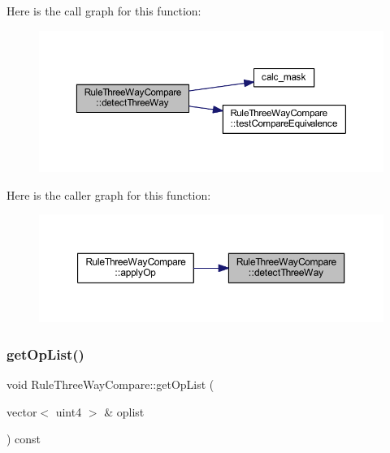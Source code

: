 Here is the call graph for this function\+:
\nopagebreak
\begin{figure}[H]
\begin{center}
\leavevmode
\includegraphics[width=350pt]{class_rule_three_way_compare_a7f9059f988deedd2d2b13697e4dac1c3_cgraph}
\end{center}
\end{figure}
Here is the caller graph for this function\+:
\nopagebreak
\begin{figure}[H]
\begin{center}
\leavevmode
\includegraphics[width=350pt]{class_rule_three_way_compare_a7f9059f988deedd2d2b13697e4dac1c3_icgraph}
\end{center}
\end{figure}
\mbox{\label{class_rule_three_way_compare_a7ad9a442c2df958ca7135b231925dd93}} 
\subsubsection{\texorpdfstring{getOpList()}{getOpList()}}
{\footnotesize\ttfamily void Rule\+Three\+Way\+Compare\+::get\+Op\+List (\begin{DoxyParamCaption}\item[{vector$<$ uint4 $>$ \&}]{oplist }\end{DoxyParamCaption}) const\hspace{0.3cm}{\ttfamily [virtual]}}



